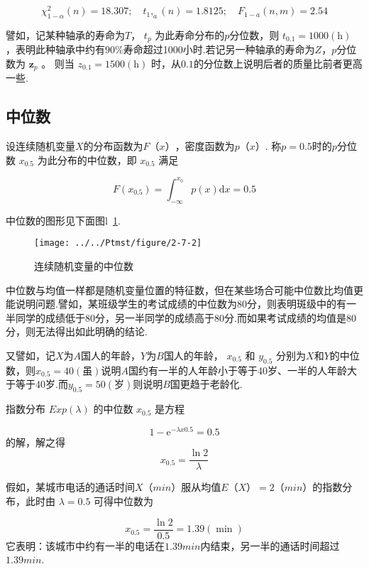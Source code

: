 \[
\chi_{1-\alpha}^{2}(n)=18.307 ; \quad t_{1},_{a}(n)=1.8125 ; \quad F_{1-a}(n, m)=2.54
\]

譬如，记某种轴承的寿命为$ T $， $t_{p}$ 为此寿命分布的$ p $分位数，则 $t_{0.1}=1000 (\mathrm{h}) $ ，表明此种轴承中约有$ 90\% $寿命超过1000小时.若记另一种轴承的寿命为$ Z $，$ p $分位数为 $\boldsymbol{z}_{p}$ 。 则当 $z_{0.1}=1500(\mathrm{h})$ 时，从$ 0.1 $的分位数上说明后者的质量比前者更高一些.

\subsection{中位数}

\begin{definition}
	设连续随机变量$ X $的分布函数为$ F（x） $，密度函数为$ p（x） $.
	称$ p=0.5 $时的$ p $分位数 $x_{0.5}$ 为此分布的中位数，即 $x_{0.5}$ 满足
	
	\begin{equation}
	F\left(x_{0.5}\right)=\int_{-\infty}^{x_{0}} p(x) \mathrm{d} x=0.5 \label{eq:2.7.8}
	\end{equation}
	
\end{definition}

中位数的图形见下面图l~\ref{fig:2-7-2}.

\begin{figure}
	\centering
	\texttt{[image: ../../Ptmst/figure/2-7-2]}
	\caption{连续随机变量的中位数}
	\label{fig:2-7-2}
\end{figure}

中位数与均值一样都是随机变量位置的特征数，但在某些场合可能中位数比均值更能说明问题.譬如，某班级学生的考试成绩的中位数为80分，则表明斑级中的有一半同学的成绩低于80分，另一半同学的成绩高于80分.而如果考试成绩的均值是80分，则无法得出如此明确的结论.

又譬如，记$ X $为$ A $国人的年龄，$ Y $为$ B $国人的年龄， $x_{0.5}$ 和 $y_{0.5}$ 分别为$ X $和$ Y $的中位数，则$x_{0.5}=40(\text{虽})$说明$ A $国约有一半的人年龄小于等于40岁、一半的人年龄大于等于40岁.而$y_{0.5}=50(\text{岁})$则说明$ B $国更趋于老龄化.

\begin{example}
	指数分布 $E x p(\lambda)$ 的中位数 $x_{0.5}$ 是方程
	
	\[
	1-\mathrm{e}^{-\lambda x 0.5}=0.5
	\]
	的解，解之得
	\[
	x_{0.5}=\frac{\ln 2}{\lambda}
	\]
	
	假如，某城市电话的通话时间$ X（min） $服从均值$ E（X）=2（min） $的指数分布，此时由 $\lambda=0.5$ 可得中位数为
	
	\[
	x_{0.5}=\frac{\ln 2}{0.5}=1.39(\min )
	\]
	它表明：该城市中约有一半的电话在$ 1.39min $内结束，另一半的通话时间超过$ 1.39 min $.
\end{example}

